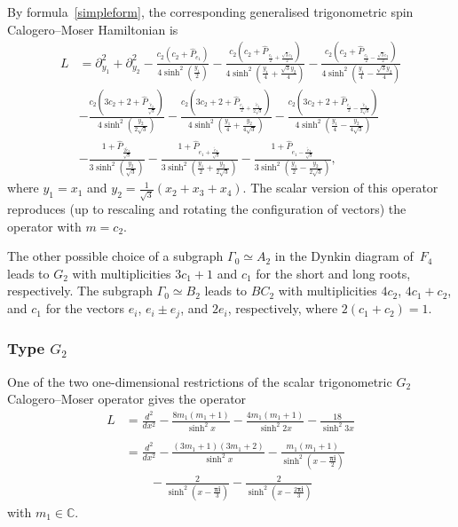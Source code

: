 \documentclass[12pt]{amsart}
\newcommand{\C}{\mathbb C}
\numberwithin{equation}{section}
\theoremstyle{definition}
\begin{document}
By formula~\eqref{simpleform}, the corresponding generalised trigonometric spin Calogero--Moser Hamiltonian is
\begin{align*}
    L &= \partial_{y_1}^2 + \partial_{y_2}^2 - \frac{c_2(c_2 + \widehat{P}_{e_1})}{4 \sinh^2(\frac{y_1}{2})} 
         - \frac{c_2\left(c_2 + \widehat{P}_{\frac{e_1}{2} + \frac{\sqrt{3}\widetilde{e}_2}{2}}\right)}{4 \sinh^2(\frac{y_1}{4} + \frac{\sqrt{3}y_2}{4})} - \frac{c_2\left(c_2 + \widehat{P}_{\frac{e_1}{2} - \frac{\sqrt{3}\widetilde{e}_2}{2}}\right)}{4 \sinh^2(\frac{y_1}{4} - \frac{\sqrt{3}y_2}{4})} \\
       &- \frac{c_2\left(3c_2 + 2 + \widehat{P}_{\frac{\widetilde{e}_2}{\sqrt{3}}}\right)}{4 \sinh^2(\frac{y_2}{2\sqrt{3}})} 
       - \frac{c_2\left(3c_2 + 2 + \widehat{P}_{\frac{e_1}{2}+\frac{\widetilde{e}_2}{2\sqrt{3}}}\right)}{4 \sinh^2 (\frac{y_1}{4} + \frac{y_2}{4 \sqrt{3}})} 
       - \frac{c_2\left(3c_2 + 2 + \widehat{P}_{\frac{e_1}{2}-\frac{\widetilde{e}_2}{2\sqrt{3}}}\right)}{4 \sinh^2 (\frac{y_1}{4} - \frac{y_2}{4 \sqrt{3}})} \\
       &- \frac{1+\widehat{P}_{\frac{2 \widetilde{e}_2}{\sqrt{3}}}}{3 \sinh^2(\frac{y_2}{\sqrt{3}})} 
       -  \frac{1 + \widehat{P}_{e_1 + \frac{\widetilde{e}_2}{\sqrt{3}}}}{3 \sinh^2(\frac{y_1}{2} + \frac{y_2}{2\sqrt{3}})} 
       - \frac{1 + \widehat{P}_{e_1 - \frac{\widetilde{e}_2}{\sqrt{3}}}}{3 \sinh^2(\frac{y_1}{2} - \frac{y_2}{2\sqrt{3}})},
\end{align*}
where $y_1 = x_1$ and $y_2 = \frac{1}{\sqrt{3}}(x_2 + x_3 + x_4)$. The scalar version of this operator %
reproduces (up to rescaling and rotating the configuration of vectors) the operator \cite[Formula (1.1)]{FV19} with $m = c_2$.

The other possible choice of a subgraph $\Gamma_0 \simeq A_2$ in the Dynkin diagram of~$F_4$ leads to $G_2$ with multiplicities $3c_1 + 1$ and $c_1$ for the short and long roots, respectively. The subgraph $\Gamma_0 \simeq B_2$ leads to $BC_2$ with multiplicities $4c_2$, $4c_1 + c_2$, and $c_1$ for the vectors $e_i$, $e_i \pm e_j$, and $2e_i$, respectively, where $2(c_1 + c_2)=1$.

\subsubsection{Type $G_2$}
One of the two one-dimensional restrictions of the scalar trigonometric $G_2$ Calogero--Moser operator gives the operator
\begin{align}
\label{op3}
    L &= \frac{d^2}{dx^2} - \frac{8 m_1 (m_1 + 1)}{\sinh^2 x}-\frac{4 m_1 (m_1 + 1)}{\sinh^2 2x}-\frac{18}{\sinh^2 3x} \\ \ \nonumber \\
     &= \frac{d^2}{dx^2} - \frac{(3m_1+1)(3m_1+2)}{\sinh^2 x} - \frac{m_1(m_1+1)}{\sinh^2(x-\frac{\boldsymbol{\pi} \boldsymbol{i}}{2})} \nonumber \\
     &\qquad - \frac{2}{\sinh^2(x-\frac{\boldsymbol{\pi} \boldsymbol{i}}{3})} 
     - \frac{2}{\sinh^2(x-\frac{2\boldsymbol{\pi} \boldsymbol{i}}{3})} \nonumber
\end{align}
with $m_1 \in \C$.
\end{document}
